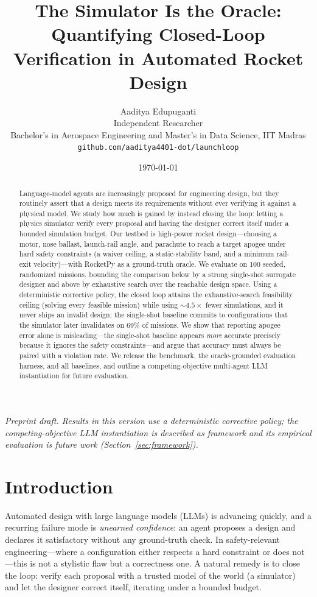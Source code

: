 \documentclass[11pt]{article}
\title{\textbf{The Simulator Is the Oracle:\\
Quantifying Closed-Loop Verification in Automated Rocket Design}}
\author{Aaditya Edupuganti\\[2pt]
  \small Independent Researcher\\
  \small Bachelor's in Aerospace Engineering and Master's in Data Science, IIT Madras\\
  \small \texttt{github.com/aaditya4401-dot/launchloop}}
\date{\today}
\begin{document}
\maketitle

\begin{abstract}
Language-model agents are increasingly proposed for engineering design, but they
routinely assert that a design meets its requirements without ever verifying it
against a physical model. We study how much is gained by instead closing the
loop: letting a physics simulator verify every proposal and having the designer
correct itself under a bounded simulation budget. Our testbed is high-power
rocket design---choosing a motor, nose ballast, launch-rail angle, and parachute
to reach a target apogee under hard safety constraints (a waiver ceiling, a
static-stability band, and a minimum rail-exit velocity)---with RocketPy as a
ground-truth oracle. We evaluate on 100 seeded, randomized missions, bounding the
comparison below by a strong single-shot surrogate designer and above by
exhaustive search over the reachable design space. Using a deterministic
corrective policy, the closed loop attains the exhaustive-search feasibility
ceiling (solving every feasible mission) while using ${\sim}4.5\times$ fewer
simulations, and it never ships an invalid design; the single-shot baseline
commits to configurations that the simulator later invalidates on 69\% of
missions. We show that reporting apogee error alone is misleading---the
single-shot baseline appears \emph{more} accurate precisely because it ignores
the safety constraints---and argue that accuracy must always be paired with a
violation rate. We release the benchmark, the oracle-grounded evaluation harness,
and all baselines, and outline a competing-objective multi-agent LLM
instantiation for future evaluation.
\end{abstract}

\noindent\textit{\small Preprint draft. Results in this version use a
deterministic corrective policy; the competing-objective LLM instantiation is
described as framework and its empirical evaluation is future work
(Section~\ref{sec:framework}).}

\section{Introduction}

Automated design with large language models (LLMs) is advancing quickly, and a
recurring failure mode is \emph{unearned confidence}: an agent proposes a design
and declares it satisfactory without any ground-truth check. In safety-relevant
engineering---where a configuration either respects a hard constraint or does
not---this is not a stylistic flaw but a correctness one. A natural remedy is to
close the loop: verify each proposal with a trusted model of the world (a
simulator) and let the designer correct itself, iterating under a bounded budget.
\end{document}
